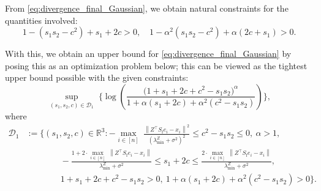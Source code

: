 \documentclass[11pt]{article}
\theoremstyle{definition}
\theoremstyle{plain}
\newcommand{\reals}{\mathbb{R}}
\providecommand{\brI}{\mathbb{I}}
\newcommand{\Norm}[1]{\left\| #1 \right\|}
\providecommand{\norm}[1]{\Norm{#1}}
\begin{document}

From \eqref{eq:divergence_final_Gaussian}, we obtain natural constraints for the quantities involved:
\begin{equation}
    \label{eq:constraints_function_log}
    1 - (s_1s_2 - c^{2}) + s_1 + 2c > 0, \quad 1 - \alpha^2\left(s_1s_2 - c^2\right) + \alpha \left(2c + s_1\right) > 0. 
\end{equation}

With this, we obtain an upper bound for \eqref{eq:divergence_final_Gaussian} by posing this as an optimization problem below; this can be viewed as the tightest upper bound possible with the given constraints:
\begin{equation}
\label{eq:opt_problem_c2ms1s2_s2}
    \sup_{(s_1,s_2,c)\in \mathcal{D}_1}\;
    \Bigg\{\log\left(\frac{\big(1+ s_1 + 2c + c^2 - s_1 s_2\big)^{\alpha}}{1 + \alpha\left( s_1 + 2c\right) + \alpha^2 \left(c^2 - s_1 s_2\right)}\right)\Bigg\},
\end{equation}
where
\begin{align*}
    \mathcal{D}_1 &:=\Bigg\{(s_1,s_2,c)\in\reals^3:
        -\underset{i\in[n]}{\max} \ \frac{\norm{Z^{\top}S_{\mathrm{f}}e_i - x_i}^2}{\left(\lambda^{Z}_{\min} + \sigma^2\right)^2}\le c^2 - s_1s_2 \le 0, \ \alpha > 1, \\ 
        &\qquad\qquad -\frac{1 + 2\cdot \underset{i\in[n]}{\max} \ \norm{Z^{\top}S_{\mathrm{f}}e_i - x_i}}{\lambda^{Z}_{\min} + \sigma^2} \leq s_1+2c \leq \frac{2\cdot \underset{i\in[n]}{\max} \ \norm{Z^{\top}S_{\mathrm{f}}e_i - x_i}}{\lambda^{Z}_{\min} + \sigma^2}, \\
        &\qquad\qquad 1+ s_1 + 2c + c^2 - s_1 s_2>0,\ 1+\alpha\left( s_1 + 2c\right) + \alpha^2 \left(c^2 - s_1 s_2\right)>0\Bigg\}.
\end{align*}
\end{document}
